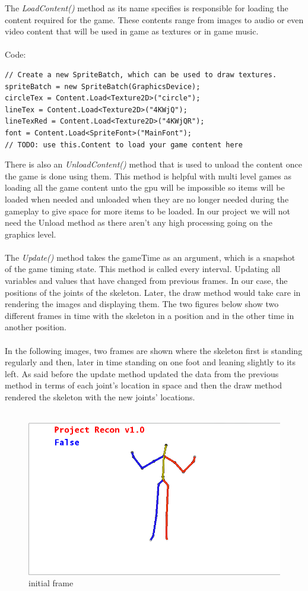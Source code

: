 The \emph{LoadContent()} method as its name specifies is responsible for loading the content required for the game. These contents range from images to audio or even video content that will be used in game as textures or in game music.
\\
\\
Code:
\begin{verbatim}
// Create a new SpriteBatch, which can be used to draw textures.
spriteBatch = new SpriteBatch(GraphicsDevice);
circleTex = Content.Load<Texture2D>("circle");
lineTex = Content.Load<Texture2D>("4KWjQ");
lineTexRed = Content.Load<Texture2D>("4KWjQR");
font = Content.Load<SpriteFont>("MainFont");
// TODO: use this.Content to load your game content here
\end{verbatim}
There is also an \emph{UnloadContent()} method that is used to unload the content once the game is done using them. This method is helpful with multi level games as loading all the game content unto the gpu will be impossible so items will be loaded when needed and unloaded when they are no longer needed during the gameplay to give space for more items to be loaded. In our project we will not need the Unload method as there aren't any high processing going on the graphics level.
\\
\\
The \emph{Update()} method takes the gameTime as an argument, which is a snapshot of the game timing state. This method is called every interval. Updating all variables and values that have changed from previous frames. In our case, the positions of the joints of the skeleton. Later, the draw method would take care in rendering the images and displaying them. The two figures below show two different frames in time with the skeleton in a position and in the other time in another position.
\\
\\
In the following images, two frames are shown where the skeleton first is standing regularly and then, later in time standing on one foot and leaning slightly to its left. As said before the update method updated the data from the previous method in terms of each joint's location in space and then the draw method rendered the skeleton with the new joints' locations.
\\
\\
\begin{figure}[ht]
\centering
\includegraphics[scale=1]{images/skeleton_frame1.png}
\caption{initial frame}
\label{4.1}
\end{figure}
